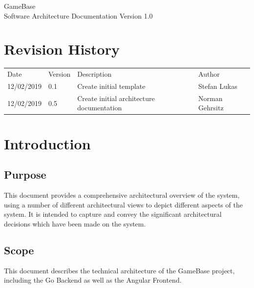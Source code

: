 \documentclass[a4paper,12pt,chapterprefix=false,bibliography=totoc,listof=totoc,]{scrreprt}
\begin{document}
	
\begin{flushright}
GameBase
\\
Software Architecture Documentation
\bigbreak
Version 1.0
\end{flushright}
\chapter*{Revision History}
\begin{table}[H]
	\centering
	\everyrow{\hline}
	\begin{tabu} to \textwidth {|X[c]|X[c]|X[c]|X[c]|}
		Date & Version & Description & Author\\
		12/02/2019 & 0.1 & Create initial template & Stefan Lukas \\
		12/02/2019 & 0.5 & Create initial architecture documentation & Norman Gehrsitz \\
	\end{tabu}
	\label{tab:rev-hist}
\end{table}

\tableofcontents

\chapter{Introduction}

\section{Purpose}
This document provides a comprehensive architectural overview of the system, using a number of different architectural views to depict different aspects of the system. It is intended to capture and convey the significant architectural decisions which have been made on the system.

\section{Scope}
This document describes the technical architecture of the GameBase project, including the Go Backend as well as the Angular Frontend.
\end{document}
